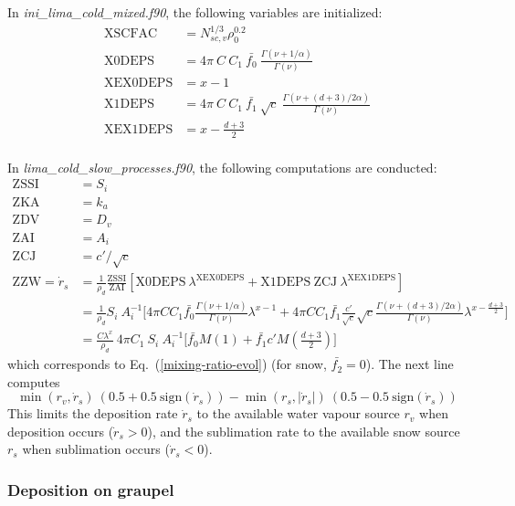 In \emph{ini\_lima\_cold\_mixed.f90}, the following variables are initialized:
\begin{align}
 \mathrm{XSCFAC} &= N_{sc,v}^{1/3} \rho_0^{0.2} \\
 \mathrm{X0DEPS} &= 4 \pi ~ C ~ C_1 ~ \bar{f_0} ~ \frac{\Gamma(\nu+1/\alpha)}{\Gamma(\nu)} \\
 \mathrm{XEX0DEPS} &= x-1 \\
 \mathrm{X1DEPS} &= 4 \pi ~ C ~ C_1 ~ \bar{f_1} ~ \sqrt{c} ~ \frac{\Gamma(\nu+(d+3)/2\alpha)}{\Gamma(\nu)} \\
 \mathrm{XEX1DEPS} &= x-\frac{d+3}{2} \\
\end{align}

In \emph{lima\_cold\_slow\_processes.f90}, the following computations are conducted:
\begin{align}
 \mathrm{ZSSI} &= S_i \\
 \mathrm{ZKA} &= k_a \\
 \mathrm{ZDV} &= D_v \\
 \mathrm{ZAI} &= A_i \\
 \mathrm{ZCJ} &= c'/\sqrt{c} \\
 \mathrm{ZZW} = \dot{r}_s &= \frac{1}{\rho_d} \frac{\mathrm{ZSSI}}{\mathrm{ZAI}} [\mathrm{X0DEPS} ~ \lambda^{\mathrm{XEX0DEPS}} + \mathrm{X1DEPS} ~ \mathrm{ZCJ} ~ \lambda^{\mathrm{XEX1DEPS}}]  \\
 &= \frac{1}{\rho_d} S_i~A_i^{-1} \bigg[ 4 \pi C C_1 \bar{f_0} \frac{\Gamma(\nu+1/\alpha)}{\Gamma(\nu)} \lambda^{x-1} + 4 \pi C C_1 \bar{f_1} \frac{c'}{\sqrt{c}} \sqrt{c} \frac{\Gamma(\nu+(d+3)/2\alpha)}{\Gamma(\nu)} \lambda^{x-\frac{d+3}{2}} \bigg] \\
 &= \frac{C \lambda^x}{\rho_d} ~ 4 \pi C_1 ~ S_i ~ A_i^{-1} \bigg[ \bar{f_0} M(1) + \bar{f_1} c' M(\frac{d+3}{2}) \bigg]
 \end{align}
which corresponds to Eq.\ (\ref{mixing-ratio-evol}) (for snow, $\bar{f_2}=0$). The next line computes
\begin{equation}
 \min(r_v,\dot{r}_s)~(0.5+0.5~\mathrm{sign}(\dot{r}_s)) - \min(r_s,|\dot{r}_s|)~(0.5-0.5~\mathrm{sign}(\dot{r}_s))
\end{equation}
This limits the deposition rate $\dot{r}_s$ to the available water vapour source $r_v$ when deposition occurs ($\dot{r}_s > 0$), and the sublimation rate to the available snow source $r_s$ when sublimation occurs ($\dot{r}_s < 0$).

\subsubsection{Deposition on graupel}

